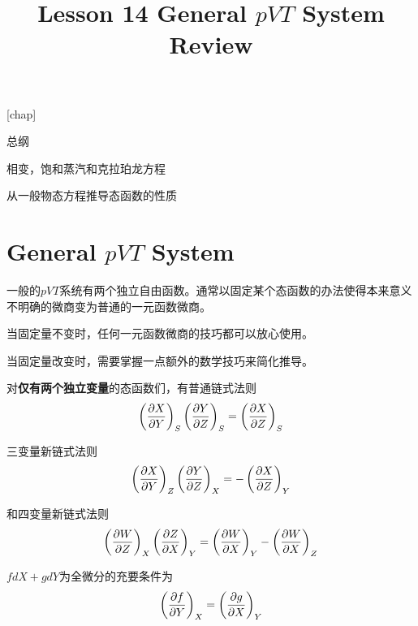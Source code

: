 \documentclass[CJK]{beamer}
\title{Lesson 14 General $pVT$ System Review}
\author{}
\date{}
\begin{document}


[chap]
\def\proid{{Problem \thechap.\theproblem}}

\begin{frame}
  \bch
  \bitem
\item{总纲}
\item{相变，饱和蒸汽和克拉珀龙方程}
\item{从一般物态方程推导态函数的性质}
  \eitem
  \ech
\end{frame}


\section{General $pVT$ System}
\setcounter{chap}{2}
\setcounter{problem}{0}

\begin{frame}
  \bch
  \bitem
  \item{一般的$pVT$系统有两个独立自由函数。通常以固定某个态函数的办法使得本来意义不明确的微商变为普通的一元函数微商。}
  \item{  当固定量不变时，任何一元函数微商的技巧都可以放心使用。}
  \item{
    当固定量改变时，需要掌握一点额外的数学技巧来简化推导。}
    \eitem
  
  \ech
\end{frame}

\begin{frame}
  \bch
  对{\bf 仅有两个独立变量}的态函数们，有普通链式法则
  $$\left(\frac{\partial X}{\partial Y}\right)_{S} \left(\frac{\partial Y}{\partial Z}\right)_{S} = \left(\frac{\partial X}{\partial Z}\right)_{S}$$

  三变量新链式法则
  $$\left(\frac{\partial X}{\partial Y}\right)_{Z} \left(\frac{\partial Y}{\partial Z}\right)_{X} = -\left(\frac{\partial X}{\partial Z}\right)_{Y}$$

  和四变量新链式法则
  $$ \left(\frac{\partial W}{\partial Z}\right)_{X} \left(\frac{\partial Z}{\partial X}\right)_{Y} = \left(\frac{\partial W}{\partial X}\right)_{Y} - \left(\frac{\partial W}{\partial X}\right)_{Z}  $$
  
  \ech
\end{frame}


\begin{frame}
  \bch
  $ f dX + g dY$为全微分的充要条件为
  $$\left(\frac{\partial f}{\partial Y}\right)_{X} = \left(\frac{\partial g}{\partial X}\right)_{Y} $$
  
  \ech
\end{frame}


\begin{frame}
  \bch
  {
  \small
  }
  \ech
\end{frame}
\end{document}
